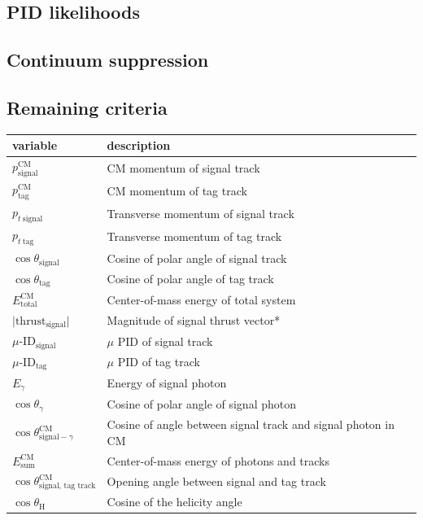 \documentclass[12pt]{thesis}  %
\begin{document}
\subsection{PID likelihoods}


\subsection{Continuum suppression}


\subsection{Remaining criteria}


\begin{table}[h]
\centering
\begin{tabular}{ll}
\textbf{variable} & \textbf{description} \\ \hline
$p_{\text{signal}}^{\text{CM}}$  & CM momentum of signal track \\
$p_{\text{tag}}^{\text{CM}}$  & CM momentum of tag track  \\
$p_{t~\text{signal}}$ & Transverse momentum of signal track \\
$p_{t~\text{tag}}$ & Transverse momentum of tag track  \\
$\cos\theta_{\text{signal}}$ & Cosine of polar angle of signal track  \\
$\cos\theta_{\text{tag}}$ & Cosine of polar angle of tag track  \\
$E_{\text{total}}^{\text{CM}}$ & Center-of-mass energy of total system    \\
$\lvert\text{thrust}_{\text{signal}}\rvert$ & Magnitude of signal thrust vector* \\
$\mu\text{-ID}_{\text{signal}}$ & $\mu$ PID of signal track  \\
$\mu\text{-ID}_{\text{tag}}$ & $\mu$ PID of tag track  \\
$E_{\gamma}$ & Energy of signal photon   \\
$\cos\theta_{\gamma}$ & Cosine of polar angle of signal photon   \\
$\cos\theta^{\text{CM}}_{\text{signal}-\gamma}$ & Cosine of angle between signal track and signal photon in CM  \\
$E_{\text{sum}}^{\text{CM}}$ & Center-of-mass energy of photons and tracks  \\
$\cos\theta^{\text{CM}}_{\text{signal, tag track}}$ & Opening angle between signal and tag track  \\
$\cos\theta_{\text{H}}$ & Cosine of the helicity angle \\

\end{tabular}
\end{table}
\end{document}
